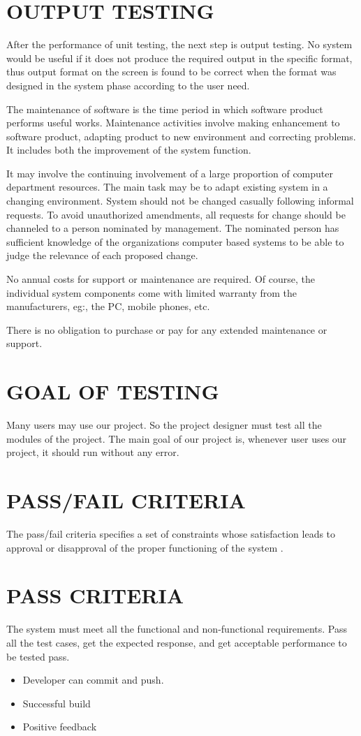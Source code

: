\documentclass[12pt,a4paper,oneside]{report}
\begin{document}
{\section{OUTPUT TESTING}
\par After the performance of unit testing, the next step is output testing. No system would be useful if it does not produce the required output in the specific format, thus output format on the screen is found to be correct when the format was designed in the system phase according to the user need.\\
\par The maintenance of software is the time period in which software product performs useful works. Maintenance activities involve making enhancement to software product, adapting product to new environment and correcting problems. It includes both the improvement of the system function.
\par It may involve the continuing involvement of a large proportion of computer department resources. The main task may be to adapt existing system in a changing environment. System should not be changed casually following informal requests. To avoid unauthorized amendments, all requests for change should be channeled to a person nominated by management. The nominated person has sufficient knowledge of the organizations computer based systems to be able to judge the relevance of each proposed change.
\par No annual costs for support or maintenance are required. Of course, the individual system components come with limited warranty from the manufacturers, eg:, the PC, mobile phones, etc.
\par There is no obligation to purchase or pay for any extended maintenance or support.
\section{GOAL OF TESTING}
\par Many users may use our project. So the project designer must test all the modules of the project. The main goal of our project is, whenever user uses our project, it should run without any error.
\section{PASS/FAIL CRITERIA}
The pass/fail criteria specifies a set of constraints whose satisfaction leads to approval or disapproval of the proper functioning of the system .
\section{PASS CRITERIA}
\par The system must meet all the functional and non-functional requirements. Pass all the test cases, get the expected response, and get acceptable performance to be tested pass.
\begin{itemize}
\item	Developer can commit and push.
\item	Successful build
\item	Positive feedback
\end{itemize}
}
\end{document}
